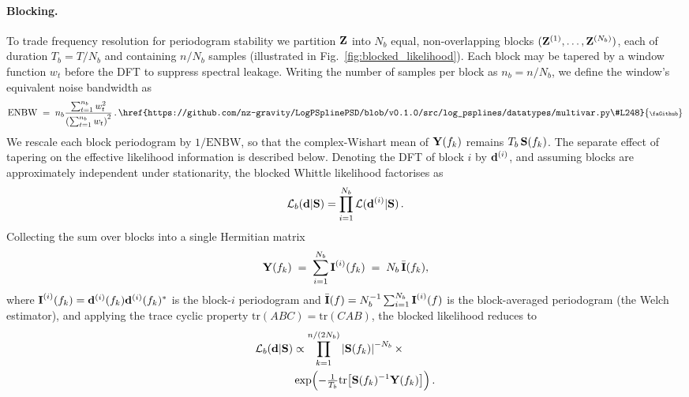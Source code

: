 \documentclass[%
	reprint,
	nofootinbib,
	amsmath,
	amssymb,
	aps,
]{revtex4-2}
\DeclareRobustCommand{\codelink}[1]{\,\href{#1}{\mbox{\scalebox{0.65}{\faGithub}}}}
\renewcommand{\d}{{\bf d}}
\renewcommand{\S}{{\bf S}}
\newcommand{\Y}{{\bf Y}}
\newcommand{\Z}{{\bf Z}}
\newcommand{\tr}{\mbox{tr}}
\newcommand{\I}{\mbox{{\bf I}}}
\begin{document}
	\paragraph*{Blocking.}
	To trade frequency resolution for periodogram stability we partition
	$\Z$ into $N_{b}$ equal, non-overlapping blocks
	$(\Z^{(1)},\ldots,\Z^{(N_{b})})$, each of duration $T_{b}=T/N_{b}$
	and containing $n/N_{b}$ samples (illustrated in
	Fig.~\ref{fig:blocked_likelihood}). Each block may be tapered by a
	window function $w_{t}$ before the DFT to suppress spectral leakage.
	Writing the number of samples per block as $n_{b}=n/N_{b}$, we define
	the window's equivalent noise bandwidth as
	\begin{equation}
		\label{eq:enbw}
		\mathrm{ENBW}
		\;=\;
		n_{b}\frac{\sum_{t=1}^{n_b}w_{t}^{2}}
		{\left(\sum_{t=1}^{n_b}w_{t}\right)^{2}}\, .
		\codelink{https://github.com/nz-gravity/LogPSplinePSD/blob/v0.1.0/src/log_psplines/datatypes/multivar.py\#L248}
	\end{equation}
	We rescale each block periodogram by
	$1/\mathrm{ENBW}$, so that the complex-Wishart mean of $\Y(f_{k})$
	remains $T_{b}\,\S(f_{k})$. The separate effect of tapering on the
	effective likelihood information is described below.
	Denoting the DFT of block $i$ by
	$\d^{(i)}$, and assuming blocks are approximately independent under
	stationarity, the blocked Whittle likelihood factorises as
	\begin{equation}
		\label{eq:block_lnl}
		\mathcal{L}_{b}(\d|\S) = \prod_{i=1}^{N_b}\mathcal{L}(\d^{(i)}|\S)\, .
	\end{equation}
	Collecting the sum over blocks into a single Hermitian matrix
	\begin{equation}
		\label{eq:Y_def}
		\Y(f_{k}) \;=\; \sum_{i=1}^{N_{b}}\I^{(i)}(f_{k})
		\;=\; N_{b}\,\bar{\I}(f_{k}),
	\end{equation}
	where $\I^{(i)}(f_{k})=\d^{(i)}(f_{k})\d^{(i)}(f_{k})^{*}$ is the
	block-$i$ periodogram and
	$\bar{\I}(f)=N_{b}^{-1}\sum_{i=1}^{N_{b}}\I^{(i)}(f)$ is the
	block-averaged periodogram (the Welch estimator), and applying the
	trace cyclic property $\tr(ABC)=\tr(CAB)$, the blocked likelihood
	reduces to
	\begin{align}
		\label{eq:blocked-trace}
		\mathcal{L}_{b}(\d|\S) & \propto \prod_{k=1}^{n/(2N_{b})}
		\left|\S(f_{k})\right|^{-N_{b}}\times \nonumber \\
		                       & \exp\!\left(-\tfrac{1}{T_{b}}\tr\!\left[\S(f_{k})^{-1}\Y(f_{k})\right]\right).
	\end{align}
\end{document}
